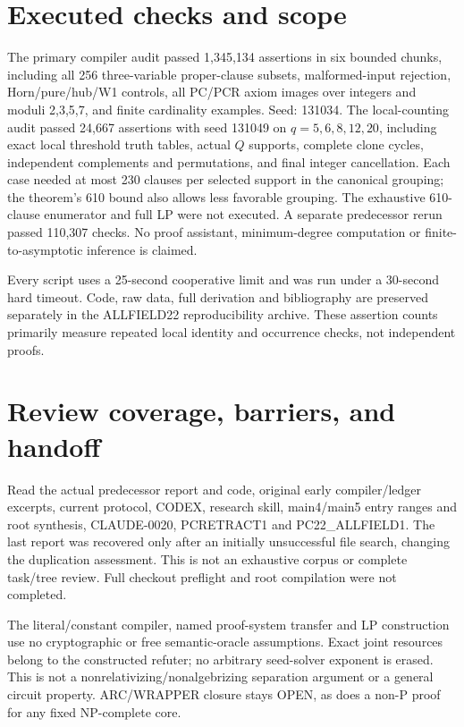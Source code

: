 \documentclass[11pt]{article}
\begin{document}
\section{Executed checks and scope}
The primary compiler audit passed 1,345,134 assertions in six bounded chunks, including all 256 three-variable proper-clause subsets, malformed-input rejection, Horn/pure/hub/W1 controls, all PC/PCR axiom images over integers and moduli 2,3,5,7, and finite cardinality examples. Seed: 131034. The local-counting audit passed 24,667 assertions with seed 131049 on $q=5,6,8,12,20$, including exact local threshold truth tables, actual $Q$ supports, complete clone cycles, independent complements and permutations, and final integer cancellation. Each case needed at most 230 clauses per selected support in the canonical grouping; the theorem's 610 bound also allows less favorable grouping. The exhaustive 610-clause enumerator and full LP were not executed. A separate predecessor rerun passed 110,307 checks. No proof assistant, minimum-degree computation or finite-to-asymptotic inference is claimed.

Every script uses a 25-second cooperative limit and was run under a 30-second hard timeout. Code, raw data, full derivation and bibliography are preserved separately in the ALLFIELD22 reproducibility archive. These assertion counts primarily measure repeated local identity and occurrence checks, not independent proofs.

\section{Review coverage, barriers, and handoff}
Read the actual predecessor report and code, original early compiler/ledger excerpts, current protocol, CODEX, research skill, main4/main5 entry ranges and root synthesis, CLAUDE-0020, PCRETRACT1 and PC22\_ALLFIELD1. The last report was recovered only after an initially unsuccessful file search, changing the duplication assessment. This is not an exhaustive corpus or complete task/tree review. Full checkout preflight and root compilation were not completed.

The literal/constant compiler, named proof-system transfer and LP construction use no cryptographic or free semantic-oracle assumptions. Exact joint resources belong to the constructed refuter; no arbitrary seed-solver exponent is erased. This is not a nonrelativizing/nonalgebrizing separation argument or a general circuit property. ARC/WRAPPER closure stays OPEN, as does a non-P proof for any fixed NP-complete core.
\end{document}

